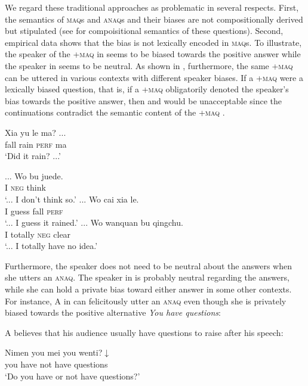 \documentclass[output=paper,colorlinks,citecolor=brown]{langscibook}
\begin{document}
We regard these   traditional approaches as problematic in several respects.  First, the semantics of  \textsc{maq}s and \textsc{anaq}s and their biases   are not compositionally derived  but stipulated (see \citealt{YuanHaraGlowinAsia2019} for compoisitional semantics of these questions). Second, empirical data shows that the bias is not lexically encoded in \textsc{maq}s. To illustrate, the  speaker of the +\textsc{maq} in  seems to be biased towards the positive answer while the speaker in  seems to be neutral.  As shown in , furthermore, the same +\textsc{maq} can be uttered in  various contexts with different speaker biases. If a +\textsc{maq} were a lexically  biased question, that is, if a +\textsc{maq} obligatorily denoted the speaker's bias towards the positive answer, then  and  would be unacceptable since the continuations contradict the semantic content of the +\textsc{maq} .

\begin{exe}
\ex\label{xiayu} \gll Xia yu le ma? ...\\
fall rain \textsc{perf} ma\\
\glt `Did  it rain? ...'
\begin{xlist}
\ex\label{xiayu1} ... \gll Wo bu juede.\\
I \textsc{neg} think \\
\glt `... I don't think so.'
\ex\label{xiayu2} ... \gll Wo cai xia le.\\
I guess fall \textsc{perf}\\
\glt `... I guess it rained.'
\ex\label{xiayu3} ... \gll Wo wanquan bu qingchu.\\
I totally \textsc{neg} clear\\
\glt `... I totally have no idea.' 
\end{xlist}
\end{exe}

Furthermore,  the speaker does not need to be neutral about the answers when she utters an \textsc{anaq}.
  The speaker  in  is probably neutral  regarding the answers, while  she can hold a private bias toward either answer in some other contexts.  For instance, A in  can felicitously utter an \textsc{anaq} even though she is privately biased towards the positive alternative \textit{You have questions}:


\begin{exe}
\ex\label{wenti}  A believes that his audience usually have questions to raise after his speech:
\begin{xlist}
 \gll Nimen you mei you wenti?$\downarrow$\\
you have not have questions\\
\glt `Do you have or not have questions?'
\end{xlist}
\end{exe}
\end{document}
